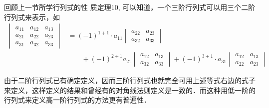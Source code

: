 回顾上一节所学行列式的性
质定理10, 可以知道，一个三阶行列式可以用三个二阶行列式来表示，如
\[\begin{split}
\begin{vmatrix}
   a_{11}&a_{12}&a_{13}\\
a_{21}&a_{22}&a_{23}\\
a_{31}&a_{32}&a_{33}  
\end{vmatrix}&=(-1)^{1+1}\cdot a_{11}\begin{vmatrix}
    a_{22}&a_{23}\\ a_{32}&a_{33} 
\end{vmatrix}\\
&\qquad +(-1)^{2+1}a_{21}\begin{vmatrix}
    a_{12}&a_{13}\\a_{32}&a_{33}  
\end{vmatrix}
+(-1)^{3+1}\cdot a_{31}\begin{vmatrix}
    a_{12}&a_{13}\\a_{22}&a_{23}
\end{vmatrix}
\end{split}\]

由于二阶行列式已有确定定义，因而三阶行列式也就完全可用上述等式右边的式子来定义，这样定义的结果和曾经有的对角线法则定义是一致的．而这种用低一阶的行列式来定义高一阶行列式的方法更有普遍性．

